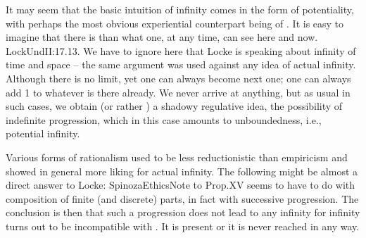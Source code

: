 \pa It may seem that the basic intuition of infinity comes in the form of
potentiality, with perhaps the most obvious experiential counterpart being
 of . It is easy to imagine that there is  than
what one, at any time, can see here and now.  \citet{[Y]et there be those who
  imagine they have positive ideas of infinite duration and space.  It would, I
  think, be enough to destroy any such positive idea of infinite, to ask him
  that has it,-- whether he could add to it or no; which would easily show the
  mistake of such a positive idea.}{LockUnd}{II:17.13. We have to ignore here
  that Locke is speaking about infinity of time and space -- the same argument
  was used against any idea of actual infinity.}  Although there is no
limit, yet one  can always become next one; one can always add 1
to whatever is there already. We never arrive at anything, but as usual in such
cases, we obtain (or rather ) a shadowy regulative idea, the
possibility of indefinite progression, which in this case amounts to
unboundedness, i.e., potential infinity.


Various forms of rationalism used to be less reductionistic than empiricism
and showed in general more liking for actual infinity.  The following might be
almost a direct answer to Locke: \citet{if an infinite line be measured out in
  foot lengths, it will consist of an infinite number of such parts; it would
  equally consist of an infinite number of parts, if each part measured only an
  inch: therefore, one infinity would be twelve times as great as the other.  --
  [...]  all these absurdities (if absurdities they be, which I am not now
  discussing), from which it is sought to extract the conclusion that extended
  substance is finite, do not at all follow from the notion of an infinite
  quantity, but merely from the notion that an infinite quantity is measurable,
  and composed of finite parts; therefore, the only fair conclusion to be drawn
  is that infinite quantity is not measurable, and cannot be composed of finite
  parts.  [...]}{SpinozaEthics}{Note to Prop.XV}
%
 seems to have to do with composition of finite (and discrete)
parts, in fact with successive progression. The conclusion is then that such a
progression does not lead to any infinity for infinity turns out to be
incompatible with . It is present  or it is never
reached in any way. 



